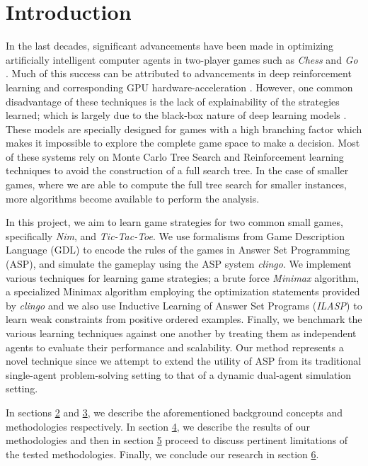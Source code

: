 \section{Introduction}

In the last decades, significant advancements have been made in optimizing artificially intelligent computer agents in two-player games such as \textit{Chess} and \textit{Go} \citep{Silver1140}. Much of this success can be attributed to advancements in deep reinforcement learning and corresponding GPU hardware-acceleration \citep{Silver1140}. However, one common disadvantage of these techniques is the lack of explainability of the strategies learned; which is largely due to the black-box nature of deep learning models \citep{DBLP:journals/corr/abs-1804-02477}. These models are specially designed for games with a high branching factor which makes it impossible to explore the complete game space to make a decision. Most of these systems rely on Monte Carlo Tree Search and Reinforcement learning techniques to avoid the construction of a full search tree. In the case of smaller games, where we are able to compute the full tree search for smaller instances, more algorithms become available to perform the analysis.

In this project, we aim to learn game strategies for two common small games, specifically \textit{Nim}, and \textit{Tic-Tac-Toe}. We use formalisms from Game Description Language (GDL) \citep{love@ggp} to encode the rules of the games in Answer Set Programming (ASP)\citep{GlimpsASP}, and simulate the gameplay using the ASP system \textit{clingo}. We implement various techniques for learning game strategies; a brute force \textit{Minimax} algorithm, a specialized Minimax algorithm employing the optimization statements provided by \textit{clingo} and we also use Inductive Learning of Answer Set Programs (\textit{ILASP}) to learn weak constraints from positive ordered examples. Finally, we benchmark the various learning techniques against one another by treating them as independent agents to evaluate their performance and scalability. Our method represents a novel technique since we attempt to extend the utility of ASP from its traditional single-agent problem-solving setting to that of a dynamic dual-agent simulation setting.

In sections \hyperref[back_con]{2} and \hyperref[methods]{3}, we describe the aforementioned background concepts and methodologies respectively. In section \hyperref[results]{4}, we describe the results of our methodologies and then in section \hyperref[discussion]{5} proceed to discuss pertinent limitations of the tested methodologies. Finally, we conclude our research in section \hyperref[conclusions]{6}.